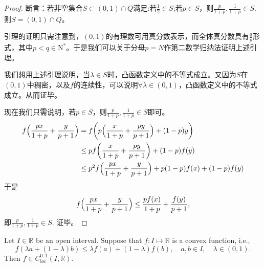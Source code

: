 \begin{proof}
断言：若非空集合$S\subset(0,1)\cap\mathit{Q}$满足:若$\frac{1}{2}\in S$;若$p\in S$，则$\frac{p}{1+p},\frac{1}{1+p}\in S.$则$S=(0,1)\cap\mathit{Q}$。

引理的证明只需注意到，$(0,1)$的有理数可用真分数表示，而全体真分数具有$\frac{q}{p}$形式，其中$p<q\in\mathrm{N}^*$。于是我们可以关于分母$p=N$作第二数学归纳法证明上述引理。

我们想用上述引理说明，当$\lambda\in S$时，凸函数定义中的不等式成立。又因为$S$在$(0,1)$中稠密，以及$f$的连续性，可以说明$\forall\lambda\in(0,1)$，凸函数定义中的不等式成立。从而证毕。

现在我们只需说明，若$p\in S$，则$\frac{p}{1+p},\frac{1}{1+p}\in S$即可。
\begin{align*}
f\Bigl(\frac{px}{1+p}+\frac{y}{p+1}\Bigr)
&= f\biggl(p\Bigl(\frac{x}{1+p} + \frac{py}{p+1}\Bigr) + (1-p)y\biggr)\\
&\leq pf\biggl(\frac{x}{1+p}+\frac{py}{p+1}\biggr)+(1-p)f(y)\\
&\leq p^2f\Bigl(\frac{px}{1+p}+\frac{y}{p+1}\Bigr)+p(1-p)f(x)+(1-p)f(y)
\end{align*}
于是
\begin{equation*}
  f\Bigl(\frac{px}{1+p}+\frac{y}{p+1}\Bigr) 
  \leq \frac{pf(x)}{1+p} + \frac{f(y)}{p+1},
\end{equation*}
即$\frac{p}{1+p},\frac{1}{1+p}\in S$. 
证毕。
\end{proof}
 
\begin{proposition}
	Let $I\in\mathbb{R}$ be an open interval. 
  Suppose that $f: I\mapsto\mathbb{R}$ is a convex function,
	i.e.,
	\[
		f(\lambda a + (1-\lambda)b) \leq \lambda f(a) + (1-\lambda)f(b),\quad a,b\in I, \quad \lambda\in(0,1).
	\]
	Then $f\in C^{0,1}_{\mathrm{loc}}(I,\mathbb R)$.
\end{proposition}

